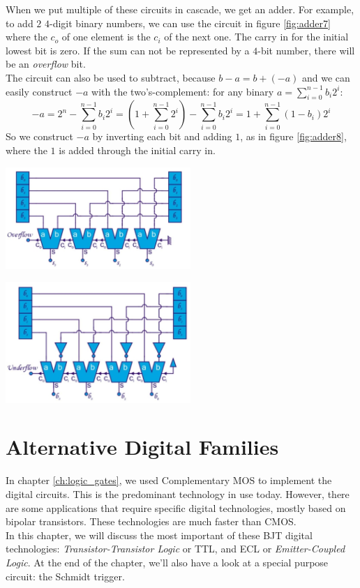 When we put multiple of these circuits in cascade, we get an adder. For example, to add $2$ $4$-digit binary numbers, we can use the circuit in figure \ref{fig:adder7} where the $c_{o}$ of one element is the $c_{i}$  of the next one. The carry in for the initial lowest bit is zero. If the sum can not be represented by a $4$-bit number, there will be an \emph{overflow} bit.\\
The circuit can also be used to subtract, because $b - a = b + (-a)$ and we can easily construct $-a$ with the two's-complement: for any binary $a = \sum_{i=0}^{n-1} b_i 2^i$:
$$-a = 2^n - \sum_{i=0}^{n-1} b_i 2^i = (1 + \sum_{i=0}^{n-1} 2^i) - \sum_{i=0}^{n-1} b_i 2^i = 1 + \sum_{i=0}^{n-1} (1-b_i) 2^i$$
So we construct $-a$ by inverting each bit and adding $1$, as in figure \ref{fig:adder8}, where the $1$ is added through the initial carry in.

\begin{minipage}{.5\textwidth}
	\centering
	\includegraphics[width=7cm]{figures/ch13/adder7.jpg}
	\label{fig:adder7}
\end{minipage}%
\begin{minipage}{.5\textwidth}
	\centering
	\includegraphics[width=7cm]{figures/ch13/adder8.jpg}
	\label{fig:adder8}
\end{minipage}

\chapter{Alternative Digital Families}
\label{ch:alternative}
In chapter \ref{ch:logic_gates}, we used Complementary MOS to implement the digital circuits. This is the predominant technology in use today. However, there are some applications that require specific digital technologies, mostly based on bipolar transistors. These technologies are much faster than CMOS.\\
In this chapter, we will discuss the most important of these BJT digital technologies: \emph{Transistor-Transistor Logic} or TTL, and ECL or \emph{Emitter-Coupled Logic}. At the end of the chapter, we'll also have a look at a special purpose circuit: the Schmidt trigger.

